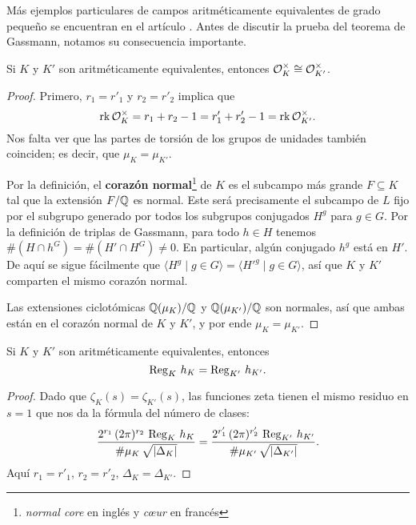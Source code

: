 Más ejemplos particulares de campos aritméticamente equivalentes de grado
pequeño se encuentran en el artículo \cite{Bosma-deSmit-2002}. Antes de discutir
la prueba del teorema de Gassmann, notamos su consecuencia importante.

\begin{corolario}
  Si $K$ y $K'$ son aritméticamente equivalentes, entonces
  $\mathcal{O}_K^\times \cong \mathcal{O}_{K'}^\times$.

  \begin{proof}
    Primero, $r_1 = r'_1$ y $r_2 = r'_2$ implica que
    $$\operatorname{rk} \mathcal{O}_K^\times = r_1 + r_2 - 1 = r'_1 + r'_2 - 1 = \operatorname{rk} \mathcal{O}_{K'}^\times.$$
    Nos falta ver que las partes de torsión de los grupos de unidades también
    coinciden; es decir, que $\mu_K = \mu_{K'}$.

    Por la definición, el \textbf{corazón normal}\footnote{\emph{normal core} en
      inglés y \emph{cœur} en francés} de $K$ es el subcampo más grande
    $F\subseteq K$ tal que la extensión $F/\mathbb{Q}$ es normal. Este será
    precisamente el subcampo de $L$ fijo por el subgrupo generado por todos los
    subgrupos conjugados $H^g$ para $g \in G$. Por la definición de triplas de
    Gassmann, para todo $h\in H$ tenemos
    $\# (H\cap h^G) = \# (H'\cap H^G) \ne 0$. En particular, algún conjugado
    $h^g$ está en $H'$. De aquí se sigue fácilmente que
    $\langle H^g \mid g\in G\rangle = \langle H'^g \mid g\in G\rangle$, así que
    $K$ y $K'$ comparten el mismo corazón normal.

    Las extensiones ciclotómicas $\mathbb{Q} (\mu_K)/\mathbb{Q}$ y $\mathbb{Q} (\mu_{K'})/\mathbb{Q}$ son
    normales, así que ambas están en el corazón normal de $K$ y $K'$, y por ende
    $\mu_K = \mu_{K'}$.
  \end{proof}
\end{corolario}

\begin{corolario}
  Si $K$ y $K'$ son aritméticamente equivalentes, entonces
  $$\operatorname{Reg}_K\,h_K = \operatorname{Reg}_{K'}\,h_{K'}.$$

  \begin{proof}
    Dado que $\zeta_K (s) = \zeta_{K'} (s)$, las funciones zeta tienen el mismo
    residuo en $s = 1$ que nos da la fórmula del número de clases:
    \[ \frac{2^{r_1}\,(2\pi)^{r_2}\,\operatorname{Reg}_K\,h_K}{\#\mu_K\,\sqrt{|\Delta_K|}} = 
      \frac{2^{r'_1}\,(2\pi)^{r'_2}\,\operatorname{Reg}_{K'}\,h_{K'}}{\#\mu_{K'}\,\sqrt{|\Delta_{K'}|}}. \]
    Aquí $r_1 = r'_1$, $r_2 = r'_2$, $\Delta_K = \Delta_{K'}$.
  \end{proof}
\end{corolario}

